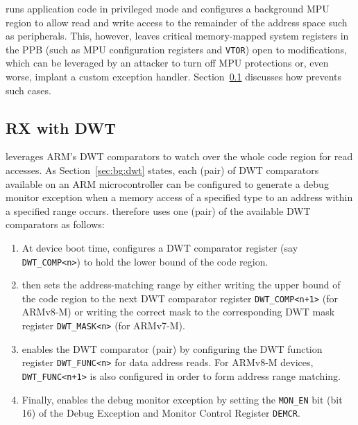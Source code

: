 {\System} runs application code in privileged mode and configures
a background MPU region to
allow read and write access to the remainder of the address space such
as peripherals.  This, however, leaves critical memory-mapped system
registers in the PPB (such as MPU configuration registers and
{\tt VTOR}) open to modifications, which can be
leveraged by an attacker to turn off MPU protections or, even worse,
implant a custom exception handler.  Section~\ref{sec:design:dwt}
discusses how {\System} prevents such cases.

\subsection{R{\XOR}X with DWT}
\label{sec:design:dwt}

{\System} leverages ARM's DWT comparators to watch over the whole
code region for read accesses.  As Section~\ref{sec:bg:dwt} states,
each (pair) of DWT comparators available on an ARM microcontroller
can be configured to generate a debug monitor exception when a
memory access of a specified type to an address within a specified
range occurs.  {\System} therefore uses one (pair) of the available DWT
comparators as follows:

\begin{enumerate}
\item
  At device boot time, {\System} configures a DWT comparator register
  (say {\tt DWT\_COMP<n>}) to hold the lower bound of the code region.
\item
  {\System} then sets the address-matching range by either writing the
  upper bound of the code region to the next DWT comparator register
  {\tt DWT\_COMP<n+1>} (for ARMv8-M) or writing the correct mask to the
  corresponding DWT mask register {\tt DWT\_MASK<n>} (for ARMv7-M).
\item
  {\System} enables the DWT comparator (pair) by configuring the DWT function
  register {\tt DWT\_FUNC<n>} for data address reads.  For ARMv8-M
  devices, {\tt DWT\_FUNC<n+1>} is also configured in order to form address
  range matching.
\item
  Finally, {\System} enables the debug monitor exception by setting the
  {\tt MON\_EN} bit (bit 16) of the Debug Exception and Monitor Control
  Register {\tt DEMCR}.
\end{enumerate}

